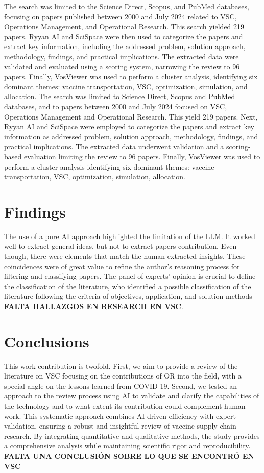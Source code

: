 \documentclass{optica-article}
\begin{document}
The search was limited to the Science Direct, Scopus, and PubMed databases, focusing on papers published between 2000 and July 2024 related to VSC, Operations Management, and Operational Research. This search yielded 219 papers. Ryyan AI and SciSpace were then used to categorize the papers and extract key information, including the addressed problem, solution approach, methodology, findings, and practical implications. The extracted data were validated and evaluated using a scoring system, narrowing the review to 96 papers. Finally, VosViewer was used to perform a cluster analysis, identifying six dominant themes: vaccine transportation, VSC, optimization, simulation, and allocation.
The search was limited to Science Direct, Scopus and PubMed databases, and to papers between 2000 and July 2024 focused on VSC, Operations Management and Operational Research. This yield 219 papers. Next, Ryyan AI and SciSpace were employed to categorize the papers and extract key information as addressed problem, solution approach, methodology, findings, and practical implications. The extracted data underwent validation and a scoring-based evaluation limiting the review to 96 papers. Finally, VosViewer was used to perform a cluster analysis identifying six dominant themes: vaccine transportation, VSC, optimization, simulation, allocation.

\section{Findings}

The use of a pure AI approach highlighted the limitation of the LLM. It worked well to extract general ideas, but not to extract papers contribution. Even though, there were elements that match the human extracted insights. These coincidences were of great value to refine the author's reasoning process for filtering and classifying papers. The panel of experts’ opinion is crucial to define the classification of the literature, who identified a possible classification of the literature following the criteria of objectives, application, and solution methods \textbf{FALTA HALLAZGOS EN RESEARCH EN VSC}.

\section{Conclusions}

This work contribution is twofold. First, we aim to provide a review of the literature on VSC focusing on the contributions of OR into the field, with a special angle on the lessons learned from COVID-19. Second, we tested an approach to the review process using AI to validate and clarify the capabilities of the technology and to what extent its contribution could complement human work. This systematic approach combines AI-driven efficiency with expert validation, ensuring a robust and insightful review of vaccine supply chain research. By integrating quantitative and qualitative methods, the study provides a comprehensive analysis while maintaining scientific rigor and reproducibility. \textbf{FALTA UNA CONCLUSIÓN SOBRE LO QUE SE ENCONTRÓ EN VSC}
 
\end{document}
